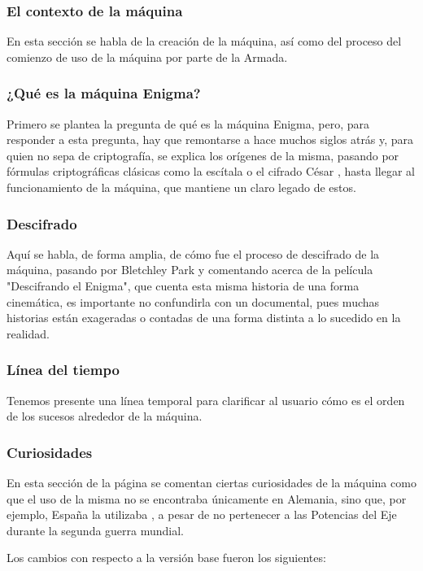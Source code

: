 \subsubsection{El contexto de la máquina}
En esta sección se habla de la creación de la máquina, así como del proceso del comienzo de uso de la máquina por parte de la Armada.

\subsubsection{¿Qué es la máquina Enigma?}
Primero se plantea la pregunta de qué es la máquina Enigma, pero, para responder a esta pregunta, hay que remontarse a hace muchos siglos atrás y, para quien no sepa de criptografía, se explica los orígenes de la misma, pasando por fórmulas criptográficas clásicas como la escítala o el cifrado César \cite{muy_interesante_encriptar}, hasta llegar al funcionamiento de la máquina, que mantiene un claro legado de estos.

\subsubsection{Descifrado}
Aquí se habla, de forma amplia, de cómo fue el proceso de descifrado de la máquina, pasando por Bletchley Park y comentando acerca de la película "Descifrando el Enigma", que cuenta esta misma historia de una forma cinemática, es importante no confundirla con un documental, pues muchas historias están exageradas o contadas de una forma distinta a lo sucedido en la realidad.

\subsubsection{Línea del tiempo}
Tenemos presente una línea temporal para clarificar al usuario cómo es el orden de los sucesos alrededor de la máquina.

\subsubsection{Curiosidades}
En esta sección de la página se comentan ciertas curiosidades de la máquina como que el uso de la misma no se encontraba únicamente en Alemania, sino que, por ejemplo, España la utilizaba \cite{taylor_enigma}, a pesar de no pertenecer a las Potencias del Eje durante la segunda guerra mundial.

Los cambios con respecto a la versión base fueron los siguientes:

